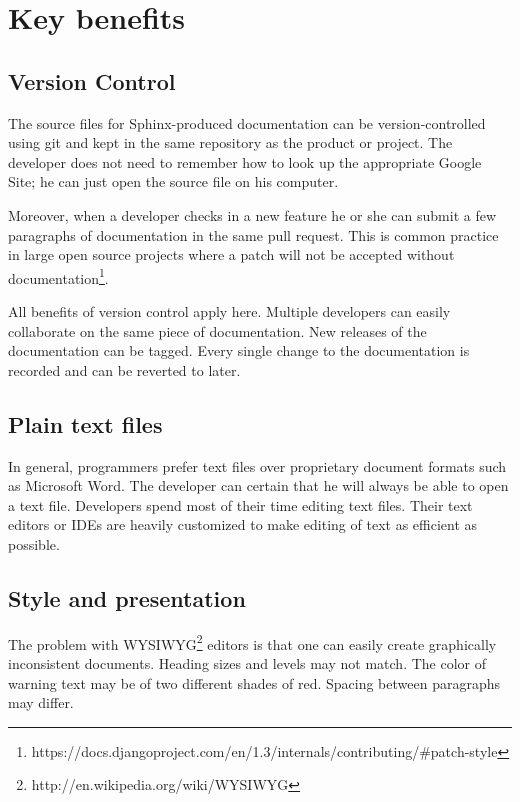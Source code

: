 \documentclass[letterpaper]{report}
\begin{document}
\section*{Key benefits}

    \subsection*{Version Control}

        The source files for Sphinx-produced documentation can be
        version-controlled using git and kept in the same repository as the
        product or project. The developer does not need to remember how to look
        up the appropriate Google Site; he can just open the source file on his
        computer.

        Moreover, when a developer checks in a new feature he or she can submit
        a few paragraphs of documentation in the same pull request. This is
        common practice in large open source projects where a patch will not be
        accepted without
        documentation\footnote{https://docs.djangoproject.com/en/1.3/internals/contributing/\#patch-style}.

        All benefits of version control apply here. Multiple developers can
        easily collaborate on the same piece of documentation. New releases of
        the documentation can be tagged. Every single change to the
        documentation is recorded and can be reverted to later.

    \subsection*{Plain text files}

        In general, programmers prefer text files over proprietary document
        formats such as Microsoft Word. The developer can certain that he will
        always be able to open a text file. Developers spend most of their time
        editing text files. Their text editors or IDEs are heavily customized
        to make editing of text as efficient as possible.

    \subsection*{Style and presentation}

        The problem with WYSIWYG\footnote{http://en.wikipedia.org/wiki/WYSIWYG}
        editors is that one can easily create graphically inconsistent
        documents. Heading sizes and levels may not match. The color of warning
        text may be of two different shades of red. Spacing between paragraphs
        may differ.
\end{document}
